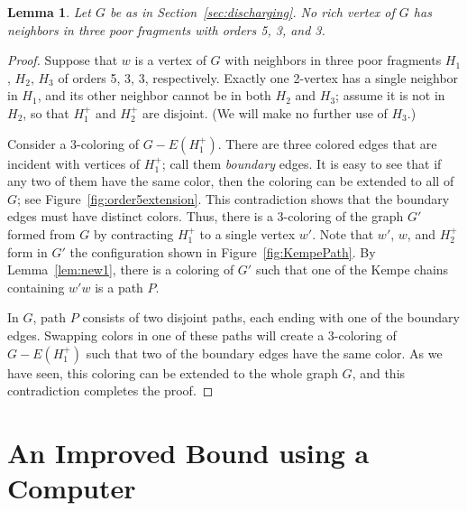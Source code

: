 \documentclass[12pt]{article}
\theoremstyle{plain}
\newtheorem{lem}[prop]{Lemma}
\theoremstyle{definition}
\theoremstyle{remark}
\begin{document}
\begin{lem}
Let $G$ be as in Section~\ref{sec:discharging}.  No rich vertex of $G$ has
neighbors in three poor fragments with orders 5, 3, and 3.
\label{lem:new3}
\end{lem}
\begin{proof}
Suppose that $w$ is a vertex of $G$ with neighbors in three poor fragments $H_1$,
$H_2$, $H_3$ of orders 5, 3, 3, respectively.  Exactly one 2-vertex has a
single neighbor in $H_1$, and its other neighbor cannot be in both $H_2$
and $H_3$; assume it is not in $H_2$, so that $H_1^+$ and $H_2^+$ are disjoint.
(We will make no further use of $H_3$.)

Consider a 3-coloring of $G-E(H_1^+)$.  There are three colored edges that are
incident with vertices of $H_1^+$; call them \emph{boundary} edges.  It is
easy to see that if any two of them have the same color, then the coloring can
be extended to all of $G$; see Figure~\ref{fig:order5extension}.  This
contradiction shows that the boundary edges must have distinct colors.  Thus,
there is a 3-coloring of the graph $G'$ formed from $G$ by contracting $H_1^+$
to a single vertex $w'$.  Note that $w'$, $w$, and $H_2^+$ form in $G'$ the
configuration shown in Figure~\ref{fig:KempePath}.  By Lemma~\ref{lem:new1},
there is a coloring of $G'$ such that one of the Kempe chains containing $w'w$
is a path $P$.

In $G$, path $P$ consists of two disjoint paths, each ending with one of the
boundary edges.  Swapping colors in one of these paths will create a 3-coloring
of $G-E(H_1^+)$ such that two of the boundary edges have the same color.  As we
have seen, this coloring can be extended to the whole graph $G$, and this
contradiction completes the proof.
\end{proof}

\section{An Improved Bound using a Computer}
\label{computer}
\end{document}
